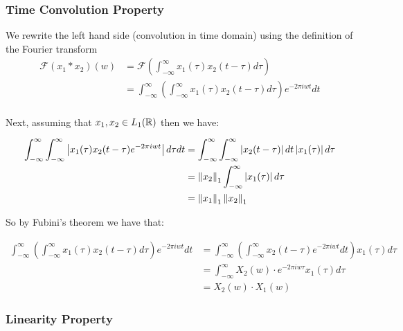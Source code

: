 \subsubsection{Time Convolution Property}

We rewrite the left hand side (convolution in time domain) using the definition of the Fourier transform 
\begin{equation}
    \begin{aligned}
        \mathcal{F}(x_1 * x_2)\left( w \right) &= \mathcal{F} \left( \int_{-\infty}^{\infty} x_1(\tau) x_2(t - \tau) d\tau \right) \\
        &= \int_{-\infty}^{\infty}  \left( \int_{-\infty}^{\infty} x_1(\tau) x_2(t - \tau) d\tau \right) e^{-2\pi i w t} dt \\
    \end{aligned}
\end{equation}

Next, assuming that $x_1, x_2 \in L_1(\mathbb{R})$ then we have:

\begin{equation}
    \begin{aligned}
        \int_{-\infty}^{\infty}\int_{-\infty}^{\infty} \sizeof{ x_1(\tau) x_2(t - \tau) e^{-2\pi i w t} } d\tau dt &= \int_{-\infty}^{\infty}\int_{-\infty}^{\infty} \sizeof{ x_2(t - \tau)} dt \sizeof{ x_1(\tau)} d\tau \\
        & =  \norm{x_2}_1 \int_{-\infty}^{\infty} \sizeof{ x_1(\tau)} d\tau \\
        &= \norm{x_1}_1 \norm{x_2}_1
    \end{aligned}
\end{equation}

So by Fubini's theorem we have that:

\begin{equation}
    \begin{aligned}
        \int_{-\infty}^{\infty}  \left( \int_{-\infty}^{\infty} x_1(\tau) x_2(t - \tau) d\tau \right) e^{-2\pi i w t} dt &= \int_{-\infty}^{\infty}  \left( \int_{-\infty}^{\infty} x_2(t - \tau) e^{-2\pi i w t}  dt \right) x_1(\tau) d \tau \\
        &= \int_{-\infty}^{\infty}  X_2(w) \cdot e^{-2\pi i w \tau} x_1(\tau) d \tau \\
        &= X_2(w) \cdot X_1(w)
    \end{aligned}
\end{equation}


\subsubsection{Linearity Property}

